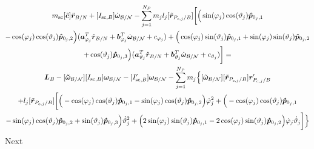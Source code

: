 \documentclass[]{BasiliskReportMemo}
\begin{document}
\begin{multline}
	m_{\text{sc}}[\tilde{\bm{c}}]\ddot{\bm r}_{B/N}+[I_{\text{sc},B}] \dot{\bm\omega}_{\cal B/N}  - \sum\limits_{j=1}^{N_P}m_j l_j [\tilde{\bm{r}}_{P_{c,j}/B}] \bigg[
	\Big(\sin(\varphi_j)\cos(\vartheta_j)\bm{\hat{p}}_{0_j,1}\\-\cos(\varphi_j)\cos(\vartheta_j)\bm{\hat{p}}_{0_j,2}\Big)(\bm a_{\varphi_j}^T \ddot{\bm{r}}_{B/N} + \bm b_{\varphi_j}^T \dot{\bm\omega}_{\cal B/N}+c_{\varphi_j}) 
	+\Big(\cos(\varphi_j)\sin(\vartheta_j)\bm{\hat{p}}_{0_j,1}+\sin(\varphi_j)\sin(\vartheta_j)\bm{\hat{p}}_{0_j,2}\\+\cos(\vartheta_j)\bm{\hat{p}}_{0_j,3} \Big)(\bm a_{\vartheta_j}^T \ddot{\bm r}_{B/N} + \bm b_{\vartheta_j}^T \dot{\bm\omega}_{\cal B/N} + c_{\vartheta_j})
	\bigg] = \\
	\bm{L}_B-[\bm{\tilde{\omega}}_{\cal B/N}] [I_{\text{sc},B}] \bm\omega_{\cal B/N}
	- [I'_{\text{sc},B}] \bm\omega_{\cal B/N}- \sum\limits_{j=1}^{N_P} m_j \Big\{[\tilde{\bm\omega}_{\cal B/N}] [\tilde{\bm{r}}_{P_{c,j}/B}] \bm{r}'_{P_{c,j}/B}\\
	+l_j[\tilde{\bm{r}}_{P_{c,j}/B}]\bigg[
	\Big(-\cos(\varphi_j)\cos(\vartheta_j)\bm{\hat{p}}_{0_j,1}-\sin(\varphi_j)\cos(\vartheta_j)\bm{\hat{p}}_{0_j,2}\Big)\dot{\varphi}_j^2
	+\Big(-\cos(\varphi_j)\cos(\vartheta_j)\bm{\hat{p}}_{0_j,1}\\-\sin(\varphi_j)\cos(\vartheta_j)\bm{\hat{p}}_{0_j,2}+\sin(\vartheta_j)\bm{\hat{p}}_{0_j,3} \Big)\dot{\vartheta}_j^2 +
	\Big(2\sin(\varphi_j)\sin(\vartheta_j)\bm{\hat{p}}_{0_j,1} -2\cos(\varphi_j)\sin(\vartheta_j)\bm{\hat{p}}_{0_j,2}\Big)\dot{\varphi}_j\dot{\vartheta}_j
	\bigg]\Big\}
	\label{eq:Final6_1}
\end{multline}
Next
\end{document}
